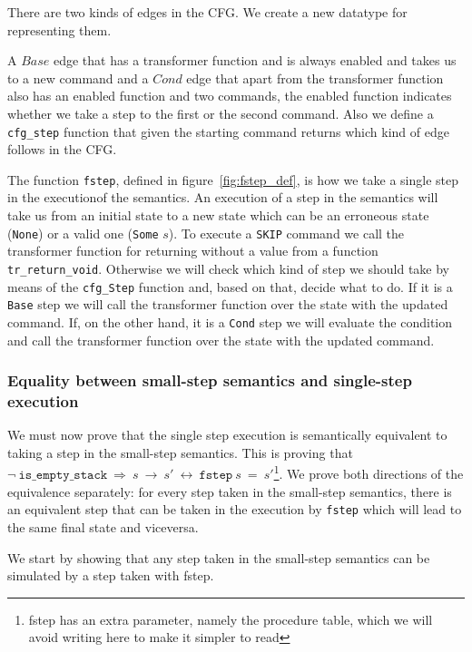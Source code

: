 There are two kinds of edges in the CFG.
We create a new datatype for representing them.


A $Base$ edge that has a transformer function and is always enabled and takes us to a new command and a $Cond$ edge that apart from the transformer function also has an enabled function and two commands, the enabled function indicates whether we take a step to the first or the second command.
Also we define a \verb|cfg_step| function that given the starting command returns which kind of edge follows in the CFG.

The function \verb|fstep|, defined in figure~\ref{fig:fstep_def}, is how we take a single step in the executionof the semantics.
An execution of a step in the semantics will take us from an initial state to a new state which can be an erroneous state (\verb|None|) or a valid one (\verb|Some| $s$).
To execute a \verb|SKIP| command we call the transformer function for returning without a value from a function \verb|tr_return_void|.
Otherwise we will check which kind of step we should take by means of the \verb|cfg_Step| function and, based on that, decide what to do.
If it is a \verb|Base| step we will call the transformer function over the state with the updated command.
If, on the other hand, it is a \verb|Cond| step we will evaluate the condition and call the transformer function over the state with the updated command.

\subsubsection{Equality between small-step semantics and single-step execution}\label{subsubsection:equality_ss_ss}

We must now prove that the single step execution is semantically equivalent to taking a step in the small-step semantics.
This is proving that $\neg\ \mathtt{is\_empty\_stack}\ \Longrightarrow\ s\ \rightarrow\ s'\ \longleftrightarrow\ \mathtt{fstep}\ s\ =\ s'$\footnote{fstep has an extra parameter, namely the procedure table, which we will avoid writing here to make it simpler to read}.
We prove both directions of the equivalence separately: for every step taken in the small-step semantics, there is an equivalent step that can be taken in the execution by \verb|fstep| which will lead to the same final state and viceversa.


We start by showing that any step taken in the small-step semantics can be simulated by a step taken with fstep.

